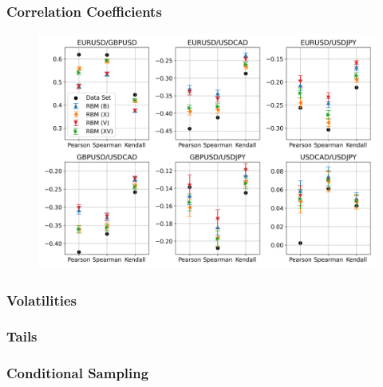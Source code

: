 \documentclass{beamer}
\begin{document}
\begin{frame}
    \frametitle{Correlation Coefficients}
    \begin{figure}
        \includegraphics[width=0.9\linewidth]{rbm/correlation_coefficients.png}
    \end{figure}
\end{frame}

\begin{frame}
    \frametitle{Volatilities}
    \begin{table}[!htb]
        \centering
        \begin{adjustbox}{max width=\textwidth}
            
        \end{adjustbox}
    \end{table}
\end{frame}

\begin{frame}
    \frametitle{Tails}
    \begin{table}[!htb]
        \centering
        \begin{adjustbox}{max width=\textwidth}
            
        \end{adjustbox}
    \end{table}
\end{frame}

\begin{frame}
    \frametitle{Conditional Sampling}
    \begin{table}[!htb]
        \centering
        \begin{adjustbox}{max width=\textwidth}
            
        \end{adjustbox}
    \end{table}
\end{frame}
\end{document}
